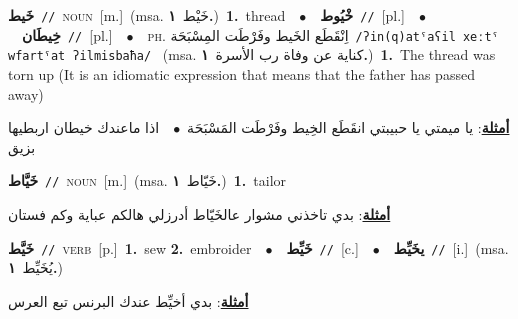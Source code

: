 \documentclass[10pt,a4paper,twoside]{article} %
\begin{document}
\begin{multicols}{2}
{\setlength\topsep{0pt}\textbf{\foreignlanguage{arabic}{خَيط}}\ {\color{gray}\texttt{//}\color{black}}\ \textsc{noun}\ [m.]\ \color{gray}(msa. \foreignlanguage{arabic}{خَيْط}~\foreignlanguage{arabic}{\textbf{١.}})\color{black}\ \textbf{1.}~thread\ \ $\bullet$\ \ \setlength\topsep{0pt}\textbf{\foreignlanguage{arabic}{خْيُوط}}\ {\color{gray}\texttt{//}\color{black}}\ [pl.]\ \ $\bullet$\ \ \setlength\topsep{0pt}\textbf{\foreignlanguage{arabic}{خِيطَان}}\ {\color{gray}\texttt{//}\color{black}}\ [pl.]\ \ $\bullet$\ \ \textsc{ph.} \color{gray} \foreignlanguage{arabic}{اِنْقَطَع الخَيط وفَرْطَت المِسْبَحَة}\color{black}\ {\color{gray}\texttt{/{\sffamily ʔin(q)atˤaʕil xeːtˤ wfartˤat ʔilmisbaħa}/}\color{black}}\ \color{gray} (msa. \foreignlanguage{arabic}{كناية عن وفاة رب الأسرة}~\foreignlanguage{arabic}{\textbf{١.}})\color{black}\ \textbf{1.}~The thread was torn up (It is an idiomatic expression that means that the father has passed away)\  \begin{flushright}\color{gray}\foreignlanguage{arabic}{\textbf{\underline{\foreignlanguage{arabic}{أمثلة}}}: يا ميمتي يا حبيبتي انقَطَع الخِيط وفَرْطَت المَسْبَحَة\ $\bullet$\ \  اذا ماعندك خيطان اربطيها بزيق}\end{flushright}\color{black}} \vspace{2mm}

{\setlength\topsep{0pt}\textbf{\foreignlanguage{arabic}{خَيَّاط}}\ {\color{gray}\texttt{//}\color{black}}\ \textsc{noun}\ [m.]\ \color{gray}(msa. \foreignlanguage{arabic}{خَيّاط}~\foreignlanguage{arabic}{\textbf{١.}})\color{black}\ \textbf{1.}~tailor\  \begin{flushright}\color{gray}\foreignlanguage{arabic}{\textbf{\underline{\foreignlanguage{arabic}{أمثلة}}}: بدي تاخذني مشوار عالخَيّاط أدرزلي هالكم عباية وكم فستان}\end{flushright}\color{black}} \vspace{2mm}

{\setlength\topsep{0pt}\textbf{\foreignlanguage{arabic}{خَيَّط}}\ {\color{gray}\texttt{//}\color{black}}\ \textsc{verb}\ [p.]\ \textbf{1.}~sew  \textbf{2.}~embroider\ \ $\bullet$\ \ \setlength\topsep{0pt}\textbf{\foreignlanguage{arabic}{خَيِّط}}\ {\color{gray}\texttt{//}\color{black}}\ [c.]\ \ $\bullet$\ \ \setlength\topsep{0pt}\textbf{\foreignlanguage{arabic}{يخَيِّط}}\ {\color{gray}\texttt{//}\color{black}}\ [i.]\ \color{gray}(msa. \foreignlanguage{arabic}{يُخَيِّط}~\foreignlanguage{arabic}{\textbf{١.}})\color{black}\  \begin{flushright}\color{gray}\foreignlanguage{arabic}{\textbf{\underline{\foreignlanguage{arabic}{أمثلة}}}: بدي أخيِّط عندك البرنس تبع العرس}\end{flushright}\color{black}} \vspace{2mm}


\end{multicols}
\end{document}
